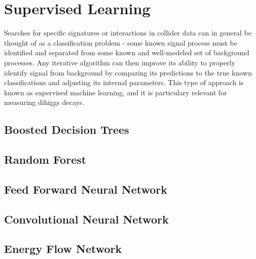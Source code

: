 \section{Supervised Learning}
\label{sec:supervised}
Searches for specific signatures or interactions in collider data can in general be thought of as a classification problem - some known signal process must be identified and separated from some known and well-modeled set of background processes. Any iterative algorithm can then improve its ability to properly identify signal from background by comparing its predictions to the true known classifications and adjusting its internal parameters. This type of approach is known as supervised machine learning, and it is particulary relevant for measuring dihiggs decays. 

\subsection{Boosted Decision Trees}


\subsection{Random Forest}


\subsection{Feed Forward Neural Network}


\subsection{Convolutional Neural Network}



%

\subsection{Energy Flow Network}

